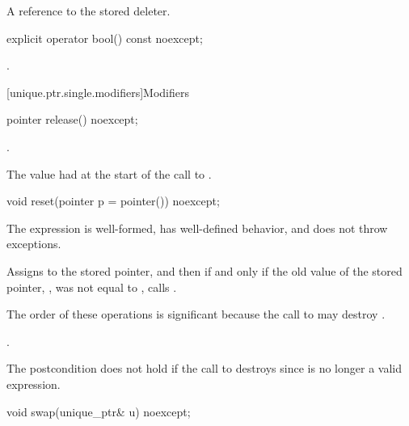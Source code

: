 \begin{itemdescr}
\pnum
\returns
A reference to the stored deleter.
\end{itemdescr}

%
\begin{itemdecl}
explicit operator bool() const noexcept;
\end{itemdecl}

\begin{itemdescr}
\pnum
\returns
{}.
\end{itemdescr}

[unique.ptr.single.modifiers]{Modifiers}

%
\begin{itemdecl}
pointer release() noexcept;
\end{itemdecl}

\begin{itemdescr}
\pnum
\ensures
{}.

\pnum
\returns
The value  had at the start of
the call to .
\end{itemdescr}

%
\begin{itemdecl}
void reset(pointer p = pointer()) noexcept;
\end{itemdecl}

\begin{itemdescr}
\pnum
\expects
The expression  is well-formed,
has well-defined behavior, and does not throw exceptions.

\pnum
\effects
Assigns  to the stored pointer, and then if and only if the old value of the
stored pointer, , was not equal to , calls
.
\begin{note}
The order of these operations is significant
because the call to  may destroy .
\end{note}

\pnum
\ensures
{}.
\begin{note}
The postcondition does not hold if the call to 
destroys  since  is no longer a valid expression.
\end{note}
\end{itemdescr}

%
\begin{itemdecl}
void swap(unique_ptr& u) noexcept;
\end{itemdecl}

